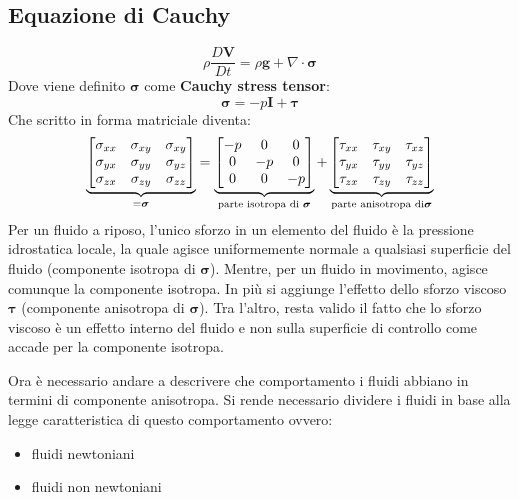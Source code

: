 \subsection{Equazione di Cauchy}
\begin{equation}
\rho \frac{D\mathbf{V}}{Dt} = \rho \mathbf{g} + \nabla \cdot \boldsymbol{\sigma}
\label{eqn:Cauchy}
\end{equation}
Dove viene definito $\boldsymbol{\sigma}$ come \textbf{Cauchy stress tensor}:
\begin{equation}
\boldsymbol{\sigma} = -p\mathbf{I} + \boldsymbol{\tau}
\label{eqn:StressTensorCauchy}
\end{equation}
Che scritto in forma matriciale diventa:
\begin{equation}
\underbrace{%
\begin{bmatrix}
\sigma_{xx} & \sigma_{xy} & \sigma_{xy} \\
\sigma_{yx} & \sigma_{yy} & \sigma_{yz} \\
\sigma_{zx} & \sigma_{zy} & \sigma_{zz}
\end{bmatrix}}_{= \boldsymbol{\sigma}} =%
\underbrace{%
\begin{bmatrix}
-p & 0 & 0 \\
0 & -p & 0 \\
0 & 0 & -p
\end{bmatrix}}_{\text{parte isotropa di } \boldsymbol{\sigma}} +%
\underbrace{%
\begin{bmatrix}
\tau_{xx} & \tau_{xy} & \tau_{xz} \\
\tau_{yx} & \tau_{yy} & \tau_{yz} \\
\tau_{zx} & \tau_{zy} & \tau_{zz} 
\end{bmatrix}}_{\text{parte anisotropa di} \boldsymbol{\sigma}}
\label{eqn:StressTensorCauchyMatrix}
\end{equation}
Per un fluido a riposo, l'unico sforzo in un elemento del fluido è la pressione idrostatica locale, la quale agisce uniformemente normale a qualsiasi superficie del fluido (componente isotropa di $\boldsymbol{\sigma}$).
Mentre, per un fluido in movimento, agisce comunque la componente isotropa. In più si aggiunge l'effetto dello sforzo viscoso $\boldsymbol{\tau}$ (componente anisotropa di $\boldsymbol{\sigma}$).
Tra l'altro, resta valido il fatto che lo sforzo viscoso è un effetto interno del fluido e non sulla superficie di controllo come accade per la componente isotropa.

Ora è necessario andare a descrivere che comportamento i fluidi abbiano in termini di componente anisotropa. Si rende necessario dividere i fluidi in base alla legge caratteristica di questo comportamento ovvero:
\begin{itemize}
\item fluidi newtoniani
\item fluidi non newtoniani
\end{itemize}

